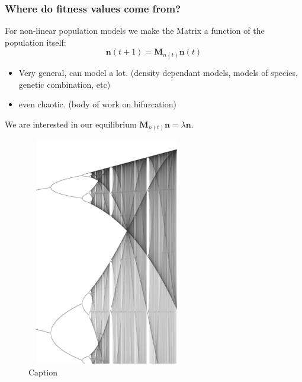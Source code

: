 \documentclass{beamer}
\begin{document}
\begin{frame}
\frametitle{Where do fitness values come from?}
For non-linear population models we make the Matrix a function of the population itself:
$$\mathbf{n}(t+1)=\mathbf{M}_{n(t)}\mathbf{n}(t)$$

\begin{itemize}
    \item Very general, can model a lot. (density dependant models, models of species, genetic combination, etc)
    \item even chaotic. (body of work on bifurcation)
\end{itemize}
We are interested in our equilibrium $\mathbf{M}_{n(t)}\mathbf{n}=\lambda \mathbf{n}$.

\begin{figure}
    \centering
    \includegraphics[width=7cm,height=10cm]{chaos.png}
    \caption{Caption}
    \label{fig:my_label}
\end{figure}
\end{frame}
\end{document}
